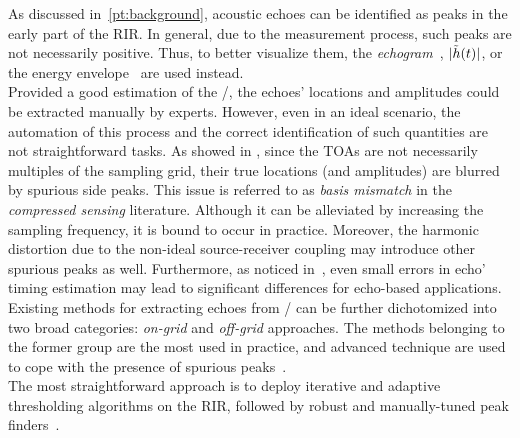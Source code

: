As discussed in~\cref{pt:background}, acoustic echoes can be identified as peaks in the early part of the \ac{RIR}.
In general, due to the measurement process, such peaks are not necessarily positive.
Thus, to better visualize them, the \textit{echogram}~, $|{\tilde{h}(t)}|$, or the energy envelope~ are used instead.
\\Provided a good estimation of the \RIRs/, the echoes' locations and amplitudes could be extracted manually by experts.
However, even in an ideal scenario, the automation of this process and the correct identification of such quantities are not straightforward tasks.
As showed in , since the \acp{TOA} are not necessarily multiples of the sampling grid, their true locations (and amplitudes) are blurred by spurious side peaks.
This issue is referred to as \textit{basis mismatch} in the \textit{compressed sensing} literature.
Although it can be alleviated by increasing the sampling frequency, it is bound to occur in practice.
Moreover, the harmonic distortion due to the non-ideal source-receiver coupling may introduce other spurious peaks as well.
Furthermore, as noticed in~, even small errors in echo' timing estimation may lead to significant differences for echo-based applications.
\\Existing methods for extracting echoes from \RIRs/ can be further dichotomized into two broad categories: \textit{on-grid} and \textit{off-grid} approaches.
The methods belonging to the former group are the most used in practice, and advanced technique are used to cope with the presence of spurious peaks~.
\\The most straightforward approach is to deploy iterative and adaptive thresholding algorithms on the \ac{RIR}, followed by robust and manually-tuned peak finders~.
